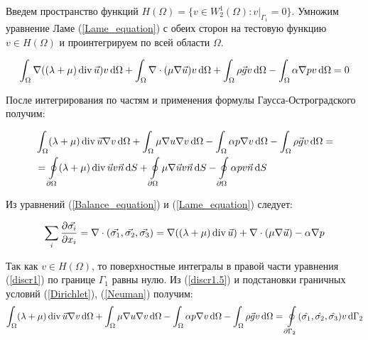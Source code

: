 \documentclass[11pt,twoside]{article}
\def\Div{\mathop{\rm div}\nolimits}
\newcommand*\diff{\mathop{}\!\mathrm{d}}
\newcommand*\grad{\nabla}
\begin{document}
Введем пространство функций $H(\Omega) = \{v \in W^1_2(\Omega) : v|_{\Gamma_1} = 0\}$.
Умножим уравнение Ламе (\ref{Lame_equation}) с обеих сторон на тестовую функцию $v \in H(\Omega)$ и проинтегрируем по всей области $\Omega$.

$$\int_{\Omega} \grad((\lambda + \mu) \Div{\vec{u}})v \diff\Omega + \int_{\Omega} \nabla \cdot (\mu \nabla {\vec{u}})v \diff\Omega + \int_{\Omega} \rho \vec{g}v\diff\Omega - \int_{\Omega}\alpha \nabla pv \diff\Omega = 0$$

После интегрирования по частям и применения формулы Гаусса-Остроградского получим:

\begin{equation}
\begin{aligned}
\label{discr1}
& \int_{\Omega} (\lambda + \mu)  \Div{\vec{u}}\nabla v \diff\Omega +
 \int_{\Omega} \mu \nabla u \nabla v \diff\Omega -
 \int_{\Omega} \alpha p \nabla v \diff\Omega - \int_{\Omega} \rho \vec{g}v\diff\Omega = \\
&= \oint \limits_{\partial {\Omega}} (\lambda + \mu) \Div \vec{u}v \vec{n} \diff{S} +
\oint\limits_{\partial {\Omega}}  \mu \nabla \vec{u} v \vec{n} \diff{S} -
 \oint\limits_{\partial {\Omega}} \alpha p v\vec{n}\diff{S}
\end{aligned}
\end{equation}

 Из уравнений (\ref{Balance_equation}) и (\ref{Lame_equation}) следует:

\begin{equation}
\begin{aligned}
\label{discr1.5}
\sum_i \frac{\partial{\vec{\sigma_i}}}{\partial{x_i}} = \nabla \cdot (\vec{\sigma_1}, \vec{\sigma_2}, \vec{\sigma_3}) = \grad( (\lambda + \mu) \Div{\vec{u}}) + \nabla \cdot (\mu \nabla{\vec{u}}) - \alpha \nabla p
\end{aligned}
\end{equation}

Так как $v \in H(\Omega)$, то поверхностные интегралы в правой части уравнения (\ref{discr1}) по границе $\Gamma_1$ равны нулю. Из (\ref{discr1.5}) и подстановки граничных условий (\ref{Dirichlet}), (\ref{Neuman}) получим:
\begin{equation}
\begin{aligned}
\label{discr2}
 \int_{\Omega} (\lambda + \mu)  \Div{\vec{u}}\nabla v \diff\Omega +
 \int_{\Omega} \mu \nabla u \nabla v \diff\Omega -
 \int_{\Omega} \alpha p \nabla v \diff\Omega - \int_{\Omega} \rho \vec{g}v\diff\Omega =
 \oint \limits_{\partial {\Gamma_2}} (\hat{\sigma_1}, \hat{\sigma_2}, \hat{\sigma_3}) v \diff\Gamma_2
\end{aligned}
\end{equation}
\end{document}
